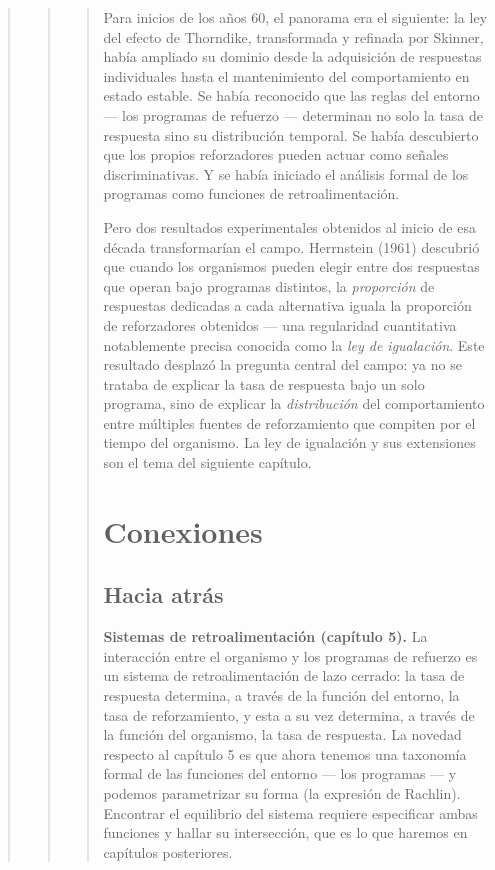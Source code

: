\documentclass[
  letterpaper,
  DIV=11,
  numbers=noendperiod]{scrreprt}
\begin{document}
\begin{tcolorbox}[enhanced jigsaw, toprule=.15mm, arc=.35mm, colback=white, opacityback=0, colframe=quarto-callout-note-color-frame, breakable, rightrule=.15mm, left=2mm, leftrule=.75mm, bottomrule=.15mm]
\begin{quote}
\begin{quote}
\begin{quote}
Para inicios de los años 60, el panorama era el siguiente: la ley del
efecto de Thorndike, transformada y refinada por Skinner, había ampliado
su dominio desde la adquisición de respuestas individuales hasta el
mantenimiento del comportamiento en estado estable. Se había reconocido
que las reglas del entorno --- los programas de refuerzo --- determinan
no solo la tasa de respuesta sino su distribución temporal. Se había
descubierto que los propios reforzadores pueden actuar como señales
discriminativas. Y se había iniciado el análisis formal de los programas
como funciones de retroalimentación.

Pero dos resultados experimentales obtenidos al inicio de esa década
transformarían el campo. Herrnstein (1961) descubrió que cuando los
organismos pueden elegir entre dos respuestas que operan bajo programas
distintos, la \emph{proporción} de respuestas dedicadas a cada
alternativa iguala la proporción de reforzadores obtenidos --- una
regularidad cuantitativa notablemente precisa conocida como la \emph{ley
de igualación}. Este resultado desplazó la pregunta central del campo:
ya no se trataba de explicar la tasa de respuesta bajo un solo programa,
sino de explicar la \emph{distribución} del comportamiento entre
múltiples fuentes de reforzamiento que compiten por el tiempo del
organismo. La ley de igualación y sus extensiones son el tema del
siguiente capítulo.

\section{Conexiones}\label{conexiones-6}

\subsection{Hacia atrás}\label{hacia-atruxe1s-1}

\textbf{Sistemas de retroalimentación (capítulo 5).} La interacción
entre el organismo y los programas de refuerzo es un sistema de
retroalimentación de lazo cerrado: la tasa de respuesta determina, a
través de la función del entorno, la tasa de reforzamiento, y esta a su
vez determina, a través de la función del organismo, la tasa de
respuesta. La novedad respecto al capítulo 5 es que ahora tenemos una
taxonomía formal de las funciones del entorno --- los programas --- y
podemos parametrizar su forma (la expresión de Rachlin). Encontrar el
equilibrio del sistema requiere especificar ambas funciones y hallar su
intersección, que es lo que haremos en capítulos posteriores.


\end{quote}
\end{quote}
\end{quote}
\end{tcolorbox}
\end{document}
